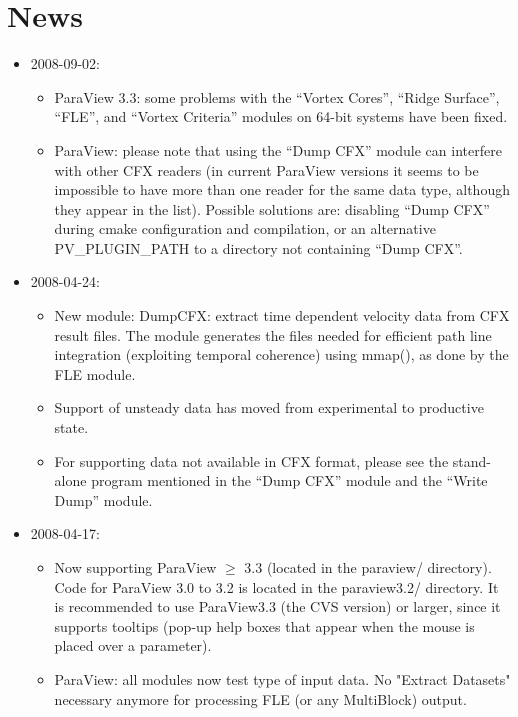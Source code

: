 \section{News}
\label{sec:news}

\begin{itemize}

\item
  2008-09-02:
  \begin{itemize}
  \item
    ParaView 3.3: some problems with the ``Vortex Cores'', ``Ridge Surface'', ``FLE'', and ``Vortex Criteria'' modules on 64-bit systems have been fixed.
  \item
    ParaView: please note that using the ``Dump CFX'' module can interfere with other CFX readers (in current ParaView versions it seems to be impossible to have more than one reader for the same data type, although they appear in the list). Possible solutions are: disabling ``Dump CFX'' during cmake configuration and compilation, or an alternative PV\_PLUGIN\_PATH to a directory not containing ``Dump CFX''.
  \end{itemize}

\item
  2008-04-24:
  \begin{itemize}
  \item
    New module: DumpCFX: extract time dependent velocity data from CFX result files. The module generates the files needed for efficient path line integration (exploiting temporal coherence) using mmap(), as done by the FLE module.
  \item
    Support of unsteady data has moved from experimental to productive state.
  \item
    For supporting data not available in CFX format, please see the stand-alone program mentioned in the ``Dump CFX'' module and the ``Write Dump'' module.
  \end{itemize}

\item
  2008-04-17:
  \begin{itemize}
  \item
    Now supporting ParaView $\geq$ 3.3 (located in the paraview/ directory). Code for ParaView 3.0 to 3.2 is located in the paraview3.2/ directory. It is recommended to use ParaView3.3 (the CVS version) or larger, since it supports tooltips (pop-up help boxes that appear when the mouse is placed over a parameter).
  \item
    ParaView: all modules now test type of input data. No "Extract Datasets" necessary anymore for processing FLE (or any MultiBlock) output.
  \end{itemize}


\end{itemize}
